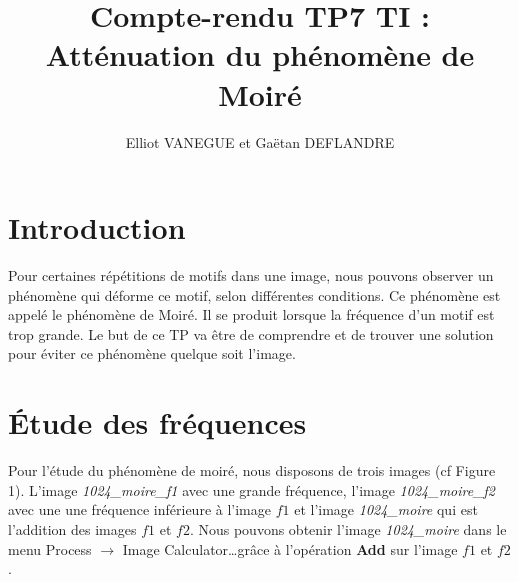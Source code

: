 \documentclass[a4paper,11pt]{article}
\title{Compte-rendu TP7 TI : Atténuation du phénomène de Moiré}
\author{Elliot VANEGUE et Gaëtan DEFLANDRE}
\begin{document}


  \maketitle
  
  \mbox{}
  \newpage
  \clearpage
  
  \section*{Introduction}
  Pour certaines répétitions de motifs dans une image, nous pouvons observer un phénomène qui déforme ce motif, selon différentes conditions. 
  Ce phénomène est appelé le phénomène de Moiré. Il se produit lorsque la fréquence d’un motif est trop grande. Le but de ce TP va être de 
  comprendre et de trouver une solution pour éviter ce phénomène quelque soit l’image.\\
 
  \section{Étude des fréquences}
  Pour l’étude du phénomène de moiré, nous disposons de trois images (cf Figure 1). L’image \textit{1024\_moire\_f1} avec une grande fréquence, 
  l’image \textit{1024\_moire\_f2} avec une une fréquence inférieure à l’image $f1$ et l’image \textit{1024\_moire} qui est l’addition des images 
  $f1$ et $f2$. Nous pouvons obtenir l’image \textit{1024\_moire} dans le menu Process $\rightarrow$ Image Calculator\ldots grâce à l’opération 
  \textbf{Add} sur l’image $f1$ et $f2$.\\
\end{document}
